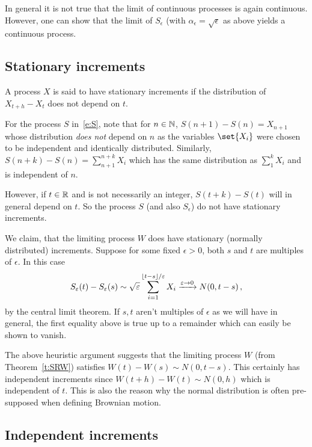 In general it is not true that the limit of continuous processes is again continuous.
However, one can show that the limit of $S_\epsilon$ (with $\alpha_\epsilon = \sqrt{\epsilon}$ as above yields a continuous process.

\subsection{Stationary increments}

\begin{definition}
  A process $X$ is said to have stationary increments if the distribution of $X_{t+h} - X_t$ does not depend on $t$.
\end{definition}

For the process $S$ in~\eqref{e:S}, note that for $n \in \mathbb{N}$, $S(n+1) - S(n) = X_{n+1}$ whose distribution \emph{does not} depend on $n$ as the variables $\set{X_i}$ were chosen to be independent and identically distributed.
Similarly, $S(n+k) - S(n) = \sum_{n+1}^{n+k} X_i$ which has the same distribution as $\sum_1^{k} X_i$ and is independent of $n$.

However, if $t \in \mathbb{R}$ and is not necessarily an integer, $S(t + k) - S(t)$ will in general depend on $t$.
So the process $S$ (and also $S_\epsilon$) do not have stationary increments.

We claim, that the limiting process $W$ does have stationary (normally distributed) increments.
Suppose for some fixed $\epsilon > 0$, both $s$ and $t$ are multiples of $\epsilon$.
In this case
\begin{equation*}
  S_\varepsilon(t) - S_\varepsilon(s)
    \sim \sqrt{\varepsilon} \sum_{i=1}^{\lfloor t - s\rfloor/\varepsilon}
	X_i
    \xrightarrow{\varepsilon \to 0} N(0, t-s)\,,
\end{equation*}
by the central limit theorem.
If $s, t$ aren't multiples of $\epsilon$ as we will have in general, the first equality above is true up to a remainder which can easily be shown to vanish.

The above heuristic argument suggests that the limiting process $W$ (from Theorem~\ref{t:SRW}) satisfies $W(t) - W(s) \sim N(0, t - s)$.
This certainly has independent increments since $W(t + h) - W(t) \sim N(0, h)$ which is independent of $t$.
This is also the reason why the normal distribution is often pre-supposed when defining Brownian motion.

\subsection{Independent increments}

